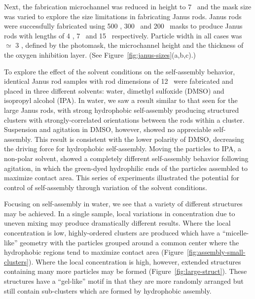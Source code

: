 Next, the fabrication microchannel was reduced in height to 7 \microns~and the mask size was varied to explore the
size limitations in fabricating Janus rods.  Janus rods were successfully fabricated 
using 500 \microns, 300 \microns~and 200 \microns~masks to produce Janus rods with lengths of 
4 \microns, 7 \microns~and 15 \microns~respectively. Particle width in all cases
was $\simeq$ 3 \microns, defined by the photomask, the 
microchannel height and the thickness of the oxygen inhibition layer. (See Figure~\ref{fig:janus-sizes}(a,b,c).)


To explore the effect of the solvent conditions on the self-assembly
behavior, identical Janus rod samples with rod dimensions of  
12   \microns~were fabricated and placed in three different solvents: water, dimethyl sulfoxide 
(DMSO) and isopropyl alcohol (IPA).  In water, we saw a result similar to that seen for the large Janus rods,
with strong hydrophobic self-assembly producing structured clusters with strongly-correlated orientations
between the rods within a cluster.  Suspension and agitation in DMSO, however, showed no appreciable self-assembly.
This result is consistent with the lower polarity of DMSO, decreasing the driving force
for hydrophobic self-assembly.  Moving the particles to IPA, a non-polar solvent, showed a completely different
self-assembly behavior following agitation, in which the green-dyed hydrophilic ends of the particles 
assembled to maximize contact area.  This series of experiments illustrated the potential for 
control of self-assembly through variation of the solvent conditions.



Focusing on self-assembly in water, we see that a variety of different structures may be 
achieved.  In a single sample, local variations in concentration due to uneven mixing may produce
dramatically different results.  Where the local concentration is low, highly-ordered clusters 
are produced which have a ``micelle-like'' geometry with the particles grouped around a common 
center where the hydrophobic regions tend to maximize contact area 
(Figure~\ref{fig:assembly-small-clusters}).  Where the local concentration
is high, however, extended structures containing many more particles may be formed
(Figure~\ref{fig:large-struct}).  These
structures have a ``gel-like'' motif in that they are more randomly arranged but still contain
sub-clusters which are formed by hydrophobic assembly.

